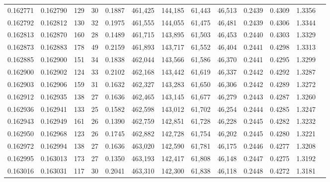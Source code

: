 \begin{tabular}{rrrrrrrrrrrrr}
0.162771 & 0.162790 &   129 &  30 &                                     0.1887 & 461,425 & 144,185 &  61,443 &  46,513 & 0.2439 & 0.4309 & 1.3356 \\
0.162792 & 0.162812 &   130 &  32 &                                     0.1975 & 461,555 & 144,055 &  61,475 &  46,481 & 0.2439 & 0.4306 & 1.3344 \\
0.162813 & 0.162870 &   160 &  28 &                                     0.1489 & 461,715 & 143,895 &  61,503 &  46,453 & 0.2440 & 0.4303 & 1.3329 \\
0.162873 & 0.162883 &   178 &  49 &                                     0.2159 & 461,893 & 143,717 &  61,552 &  46,404 & 0.2441 & 0.4298 & 1.3313 \\
0.162885 & 0.162900 &   151 &  34 &                                     0.1838 & 462,044 & 143,566 &  61,586 &  46,370 & 0.2441 & 0.4295 & 1.3299 \\
0.162900 & 0.162902 &   124 &  33 &                                     0.2102 & 462,168 & 143,442 &  61,619 &  46,337 & 0.2442 & 0.4292 & 1.3287 \\
0.162903 & 0.162906 &   159 &  31 &                                     0.1632 & 462,327 & 143,283 &  61,650 &  46,306 & 0.2442 & 0.4289 & 1.3272 \\
0.162912 & 0.162935 &   138 &  27 &                                     0.1636 & 462,465 & 143,145 &  61,677 &  46,279 & 0.2443 & 0.4287 & 1.3260 \\
0.162936 & 0.162941 &   133 &  25 &                                     0.1582 & 462,598 & 143,012 &  61,702 &  46,254 & 0.2444 & 0.4285 & 1.3247 \\
0.162943 & 0.162949 &   161 &  26 &                                     0.1390 & 462,759 & 142,851 &  61,728 &  46,228 & 0.2445 & 0.4282 & 1.3232 \\
0.162950 & 0.162968 &   123 &  26 &                                     0.1745 & 462,882 & 142,728 &  61,754 &  46,202 & 0.2445 & 0.4280 & 1.3221 \\
0.162972 & 0.162994 &   138 &  27 &                                     0.1636 & 463,020 & 142,590 &  61,781 &  46,175 & 0.2446 & 0.4277 & 1.3208 \\
0.162995 & 0.163013 &   173 &  27 &                                     0.1350 & 463,193 & 142,417 &  61,808 &  46,148 & 0.2447 & 0.4275 & 1.3192 \\
0.163016 & 0.163031 &   117 &  30 &                                     0.2041 & 463,310 & 142,300 &  61,838 &  46,118 & 0.2448 & 0.4272 & 1.3181 \\

\end{tabular}
